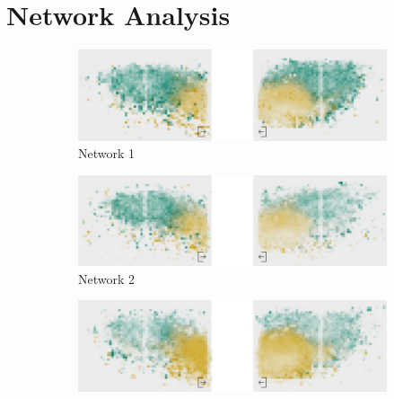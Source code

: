 \chapter{Network Analysis}
\label{ch:appendix:analysis}

\begin{figure}[htb]
	\centering
	\begin{subfigure}[b]{1.0\textwidth}
		\centering
		\includegraphics[width=\textwidth]{Figures/le_network1}
		\caption[Network 1]{Network 1}
		\label{fig:le1}
		\vspace*{5mm}
	\end{subfigure}
	\begin{subfigure}[b]{1.0\textwidth}
		\includegraphics[width=\textwidth]{Figures/le_network2}
		\caption[Network 2]{Network 2}
		\label{fig:le2}
		\vspace*{5mm}
	\end{subfigure}
	\begin{subfigure}[b]{1.0\textwidth}
		\includegraphics[width=\textwidth]{Figures/le_network3}

\end{subfigure}
\end{figure}
